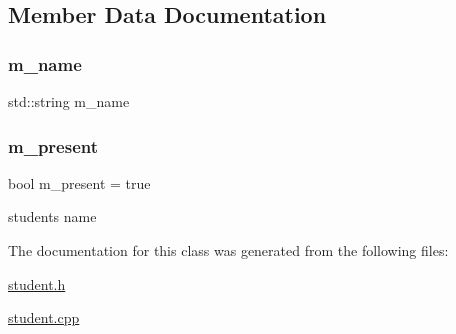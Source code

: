 \subsection{Member Data Documentation}
\mbox{\label{classStudent_adb41893ba19e889e56c559f25fc1a68a}} 
\subsubsection{\texorpdfstring{m\+\_\+name}{m\_name}}
{\footnotesize\ttfamily std\+::string m\+\_\+name\hspace{0.3cm}{\ttfamily [private]}}

\mbox{\label{classStudent_a2614877b81d48e893c3ecd519278bbd7}} 
\subsubsection{\texorpdfstring{m\+\_\+present}{m\_present}}
{\footnotesize\ttfamily bool m\+\_\+present = true\hspace{0.3cm}{\ttfamily [private]}}



student\textquotesingle{}s name 



The documentation for this class was generated from the following files\+:\begin{DoxyCompactItemize}
\item 
\hyperlink{student_8h}{student.\+h}\item 
\hyperlink{student_8cpp}{student.\+cpp}\end{DoxyCompactItemize}
